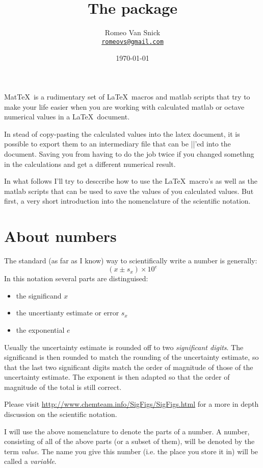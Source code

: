 \documentclass[a4paper,10pt]{article}
\author{Romeo Van Snick\\
\href{mailto:romeovs@gmail.com}{\nolinkurl{romeovs@gmail.com}}}
\date{\today}
\title{The \mt package}
\newcommand{\mt}{Mat\TeX\ }
\begin{document}
\maketitle

\mt is a rudimentary set of \LaTeX\ macros and matlab scripts that try to make your life easier when you are working with calculated matlab or octave numerical values in a \LaTeX\ document.

In stead of copy-pasting the calculated values into the latex document, it is possible to export them to an intermediary file that can be ||'ed into the document. Saving you from having to do the job twice if you changed somethng in the calculations and get a different numerical result.

In what follows I'll try to desccribe how to use the \LaTeX\ macro's as well as the matlab scripts that can be used to save the values of you calculated values. But first, a very short introduction into the nomenclature of the scientific notation.


\section{About numbers}
The standard (as far as I know) way to scientifically write a number is generally:
\[ 
	(x \pm s_x) \times 10 ^{e}
\]
In this notation several parts are distinguised:
\begin{itemize}
	\item the significand \( x \)
	\item the uncertianty estimate or error \( s_x \)
	\item the exponential \( e \)
\end{itemize}
Usually the uncertainty estimate is rounded off to two \emph{significant digits}. The significand is then rounded to match the rounding of the uncertainty estimate, so that the last two significant digits match the order of magnitude of those of the uncertainty estimate. The exponent is then adapted so that the order of magnitude of the total is still correct. 

Please visit \url{http://www.chemteam.info/SigFigs/SigFigs.html} for a more in depth discussion on the scientific notation.

I will use the above nomenclature to denote the parts of a number. A number, consisting of all of the above parts (or a subset of them), will be denoted by the term \emph{value}. The name you give this number (i.e. the place you store it in) will be called a \emph{variable}. 
\end{document}
